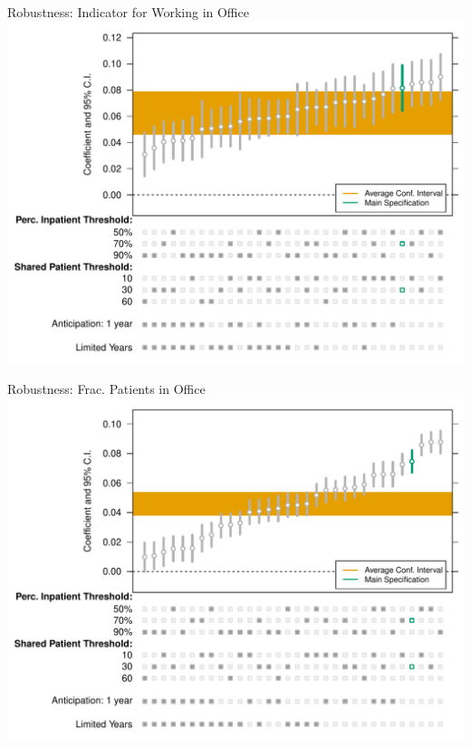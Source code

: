 \documentclass[notes,11pt, aspectratio=169]{beamer}
\begin{document}
\begin{frame}[noframenumbering]{Robustness: Indicator for Working in Office}
\label{Robustness: Indicator for Working in Office}
\centering
    \includegraphics[scale=.45]{Objects/office_ind_chart.pdf}
    \hyperlink{Effect of EHR Exposure on Likelihood of Working in Office}{}
\end{frame}

\begin{frame}[noframenumbering]{Robustness: Frac. Patients in Office}
\label{Robustness: Frac. Patients in Office}
\centering
    \includegraphics[scale=.45]{Objects/office_frac_chart.pdf}
    \hyperlink{Effect of EHR Exposure on Fraction of Patients in Office}{}
\end{frame}
\end{document}

